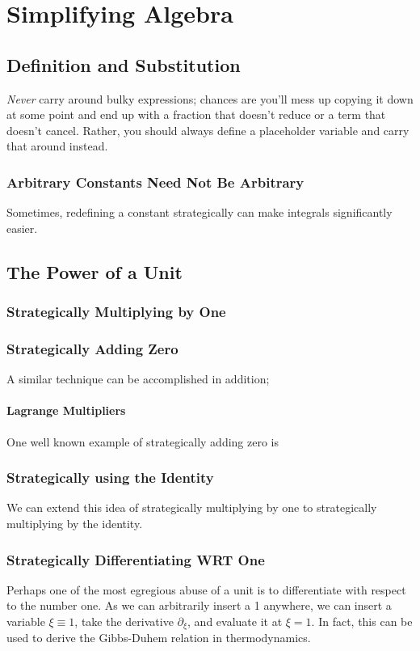 \chapter{Simplifying Algebra}
\section{Definition and Substitution}
\emph{Never} carry around bulky expressions; chances are you'll mess up copying it down at some point and end up with a fraction that doesn't reduce or a term that doesn't cancel. Rather, you should always define a placeholder variable and carry that around instead.
\subsection{Arbitrary Constants Need Not Be Arbitrary}
Sometimes, redefining a constant strategically can make integrals significantly easier.


\section{The Power of a Unit}
\subsection{Strategically Multiplying by One}
\subsection{Strategically Adding Zero}
A similar technique can be accomplished in addition;

\subsubsection{Lagrange Multipliers}
One well known example of strategically adding zero is 

\subsection{Strategically using the Identity}
We can extend this idea of strategically multiplying by one to strategically multiplying by the identity.

\subsection{Strategically Differentiating WRT One}
Perhaps one of the most egregious abuse of a unit is to differentiate with respect to the number one. As we can arbitrarily insert a 1 anywhere, we can insert a variable \(\xi \equiv 1\), take the derivative \(\partial_\xi\), and evaluate it at \(\xi = 1\). In fact, this can be used to derive the Gibbs-Duhem relation in thermodynamics.

